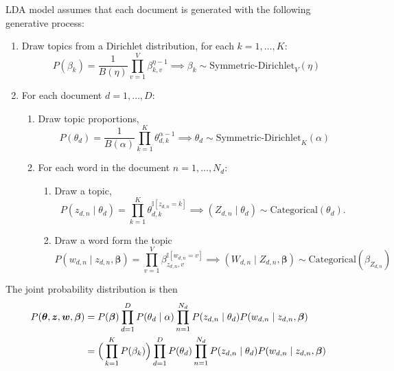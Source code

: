 LDA model assumes that each document is generated with the following generative process:
\begin{enumerate}
  \item Draw topics from a Dirichlet distribution, for each \(k=1,\dots,K\):
    \[
    P(\beta_{k}) = \frac{1}{B(\eta)} \prod_{v=1}^{V}\beta_{k,v}^{\eta - 1} \implies \beta_{k} \sim \text{Symmetric-Dirichlet}_{V}(\eta)
    \]
  \item For each document \(d = 1,\dots,D\):
    \begin{enumerate}
      \item Draw topic proportions,
        \[
        P(\theta_{d}) = \frac{1}{B(\alpha)} \prod_{k=1}^{K}\theta_{d,k}^{\alpha-1} \implies \theta_{d} \sim \text{Symmetric-Dirichlet}_{K}(\alpha)
        \]
      \item For each word in the document \(n = 1,\dots,N_{d}\):
        \begin{enumerate}
          \item Draw  a topic,
            \[
            P(z_{d,n} \mid \theta_{d}) = \prod_{k=1}^{K}\theta_{d,k}^{\mathbb{I}[z_{d,n}=k]} \implies  (Z_{d,n} \mid \theta_{d}) \sim \text{Categorical}(\theta_d).
            \]
          \item Draw a word form the topic
            \[
            P(w_{d,n}\mid z_{d,n}, \bm{\beta}) = \prod_{v=1}^{V}\beta_{z_{d,n},v}^{\mathbb{I}[w_{d,n}=v]} \implies (W_{d,n} \mid Z_{d,n},\bm{\beta}) \sim \text{Categorical}(\beta_{Z_{d,n}})
            \]
        \end{enumerate}
    \end{enumerate}
\end{enumerate}

The joint probability distribution is then
\[
  \begin{aligned}
    P(\bm{\theta}, \bm{z}, \bm{w}, \bm{\beta})
    &= P(\bm{\beta})\prod_{d=1}^{D}P(\theta_{d}\mid \alpha)\prod_{n=1}^{N_{d}}P(z_{d,n}\mid \theta_{d})P(w_{d,n} \mid z_{d,n}, \bm{\beta})\\
    &= \Big( \prod_{k=1}^{K}P(\beta_{k}) \Big)\prod_{d=1}^{D}P(\theta_{d})\prod_{n=1}^{N_{d}}P(z_{d,n}\mid \theta_{d})P(w_{d,n} \mid z_{d,n}, \bm{\beta})
  \end{aligned}
\]

